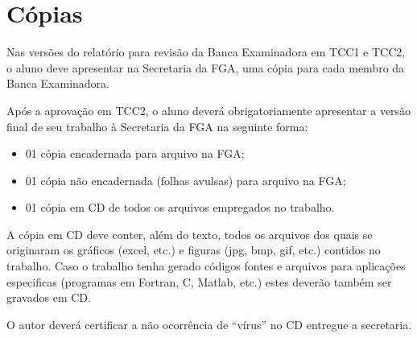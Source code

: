 \section{Cópias}

Nas versões do relatório para revisão da Banca Examinadora em TCC1 e TCC2, 
o aluno deve apresentar na Secretaria da FGA, uma cópia para cada membro da 
Banca Examinadora.

Após a aprovação em TCC2, o aluno deverá obrigatoriamente apresentar a 
versão final de seu trabalho à Secretaria da FGA na seguinte forma:

\begin{itemize}
	\item 01 cópia encadernada para arquivo na FGA;
	\item 01 cópia não encadernada (folhas avulsas) para arquivo na FGA;
	\item 01 cópia em CD de todos os arquivos empregados no trabalho.
\end{itemize}

A cópia em CD deve conter, além do texto, todos os arquivos dos quais se 
originaram os gráficos (excel, etc.) e figuras (jpg, bmp, gif, etc.) 
contidos no trabalho. Caso o trabalho tenha gerado códigos fontes e 
arquivos para aplicações especificas (programas em Fortran, C, Matlab, 
etc.) estes deverão também ser gravados em CD. 

O autor deverá certificar a não ocorrência de “vírus” no CD entregue a 
secretaria. 

